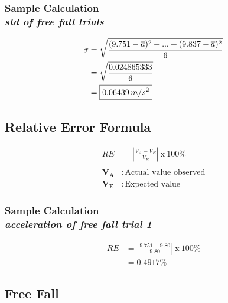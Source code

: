 \documentclass[a4paper,12pt]{article}
\begin{document}
\subsubsection{Sample Calculation \\ {\normalfont \small\textit{std of free fall trials}}}

\begin{align*}
	\sigma &= \sqrt{\frac{(9.751-\overline{a})^2 + ... + (9.837-\overline{a})^2}{6}} \\
		 &= \sqrt{\frac{0.024865333}{6}} \\
		 &= \boxed{0.06439\thinspace m/s^2}
\end{align*}

\subsection{Relative Error Formula}

\begin{align*}
	RE &= \left| {\frac{V_A-V_E}{V_E}} \right|\: \text{x}\: 100\% \\ \\
	\boldsymbol{V_A} &:\, \text{Actual value observed} \\
	\boldsymbol{V_E} &:\, \text{Expected value} 
\end{align*}

\subsubsection{Sample Calculation \\ {\normalfont \small\textit{acceleration of free fall trial 1}}}

\begin{align*}
	RE &= \left| {\frac{9.751-9.80}{9.80}} \right|\: \text{x}\: 100\% \\
			&= \boxed{0.4917\%} 
\end{align*}

\subsection{Free Fall}
\end{document}
